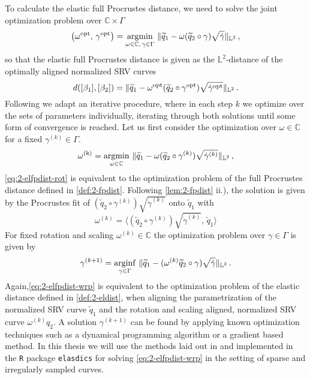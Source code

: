 \noindent To calculate the elastic full Procrustes distance, we need to solve the joint optimization problem over $\mathbb{C} \times \Gamma$
\begin{equation}
  \label{eq:2-elfpdist-opt}
  \left(\omega^\text{opt},\, \gamma^\text{opt} \right) = \operatorname*{argmin}_{\omega \in \mathbb{C},\, \gamma \in \Gamma} \,\, \lVert\widetilde q_1 - \omega (\widetilde q_2 \circ \gamma) \sqrt{\dot\gamma}\rVert_{\mathbb{L}^2}\,,
\end{equation}
so that the elastic full Procrustes distance is given as the $\mathbb{L}^2$-distance of the optimally aligned normalized SRV curves
\begin{equation}
  d([\beta_1], [\beta_2]) = \lVert\widetilde q_1 - \omega^\text{opt} ( \widetilde q_2 \circ \gamma^\text{opt}) \sqrt{\dot\gamma^\text{opt}}\rVert_{\mathbb{L}^2}\,.
\end{equation}
Following \cite{SrivastavaEtAl2011} we adapt an iterative procedure, where in each step $k$ we optimize over the sets of parameters individually, iterating through both solutions until some form of convergence is reached.
Let us first consider the optimization over $\omega \in \mathbb{C}$ for a fixed $\gamma^{(k)} \in \Gamma$.
\begin{equation}
  \label{eq:2-elfpdist-rot}
  \omega^\text{(k)}= \operatorname*{argmin}_{\omega \in \mathbb{C}}\,\, \lVert\widetilde q_1 - \omega (\widetilde q_2 \circ \gamma^{(k)}) \sqrt{\dot{\gamma}^{(k)}}\rVert_{\mathbb{L}^2}\,,
\end{equation}
\cref{eq:2-elfpdist-rot} is equivalent to the optimization problem of the full Procrustes distance defined in \cref{def:2-fpdist}.
Following \cref{lem:2-fpdist} ii.), the solution is given by the Procrustes fit of $(\widetilde q_2 \circ \gamma^{(k)}) \sqrt{\dot\gamma^{(k)}}$ onto $\widetilde q_1$ with 
\begin{equation}
  \label{eq:2-elfpdist-rot-opt}
  \omega^{(k)} =\langle (\widetilde q_2 \circ \gamma^{(k)}) \sqrt{\dot\gamma^{(k)}},\, \widetilde q_1 \rangle
\end{equation}
For fixed rotation and scaling $\omega^{(k)} \in \mathbb{C}$ the optimization problem over $\gamma \in \Gamma$ is given by 
\begin{equation}
  \label{eq:2-elfpdist-wrp}
  \gamma^{(k+1)} = \operatorname*{arginf}_{\gamma \in \Gamma}\,\, \lVert\widetilde q_1 - (\omega^{(k)} \widetilde q_2 \circ \gamma) \sqrt{\dot\gamma}\rVert_{\mathbb{L}^2}\,.
\end{equation}
Again,\cref{eq:2-elfpdist-wrp} is equivalent to the optimization problem of the elastic distance defined in \cref{def:2-eldist}, when aligning the parametrization of the normalized SRV curve $\widetilde q_1$ and the rotation and scaling aligned, normalized SRV curve $\omega^{(k)} q_2$.
A solution $\gamma^{(k+1)}$ can be found by applying known optimization techniques such as a dynamical programming algorithm or a gradient based method.
In this thesis we will use the methods laid out in \cite{Steyer2021} and implemented in the \texttt{R} package \texttt{elasdics} \parencite{elasdics} for solving \cref{eq:2-elfpdist-wrp} in the setting of sparse and irregularly sampled curves.

